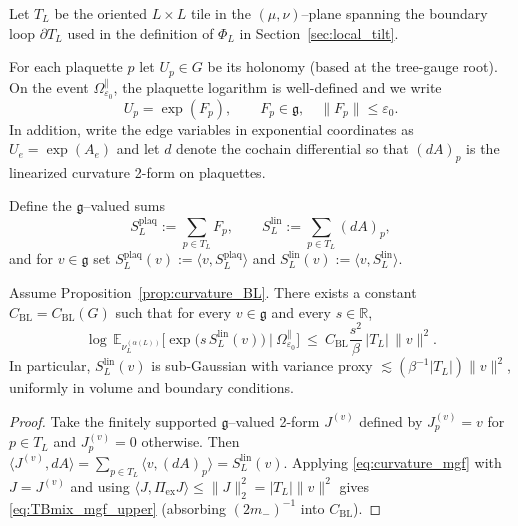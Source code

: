 \begin{definition}\label{def:surface_curvature_sum}
Let $T_L$ be the oriented $L\times L$ tile in the $(\mu,\nu)$--plane spanning the boundary loop $\partial T_L$ used in the definition
of $\Phi_L$ in Section~\ref{sec:local_tilt}. 

For each plaquette $p$ let $U_p\in G$ be its holonomy (based at the tree-gauge root). On the event $\Omega_{\varepsilon_0}^{\parallel}$,
the plaquette logarithm is well-defined and we write
\[
U_p=\exp(F_p),\qquad F_p\in\mathfrak g,\quad \|F_p\|\le \varepsilon_0.
\]
In addition, write the edge variables in exponential coordinates as $U_e=\exp(A_e)$ and let $d$ denote the cochain differential so that
$(dA)_p$ is the linearized curvature 2-form on plaquettes.

Define the $\mathfrak g$--valued sums
\[
S_L^{\mathrm{plaq}}:=\sum_{p\in T_L}F_p,\qquad
S_L^{\mathrm{lin}}:=\sum_{p\in T_L}(dA)_p,
\]
and for $v\in\mathfrak g$ set $S_L^{\mathrm{plaq}}(v):=\langle v,S_L^{\mathrm{plaq}}\rangle$ and
$S_L^{\mathrm{lin}}(v):=\langle v,S_L^{\mathrm{lin}}\rangle$.
\end{definition}


\begin{lemma}\label{lem:TBmix_subgaussian}
Assume Proposition~\ref{prop:curvature_BL}. There exists a constant $C_{\mathrm{BL}}=C_{\mathrm{BL}}(G)$ such that for every $v\in\mathfrak g$
and every $s\in\mathbb R$,
\begin{equation}\label{eq:TBmix_mgf_upper}
\log\,\mathbb E_{\nu_L^{(\alpha(L))}}\Big[\exp\big(s\,S_L^{\mathrm{lin}}(v)\big)\ \big|\ \Omega_{\varepsilon_0}^{\parallel}\Big]
\ \le\ C_{\mathrm{BL}}\frac{s^2}{\beta}\,|T_L|\,\|v\|^2.
\end{equation}
In particular, $S_L^{\mathrm{lin}}(v)$ is sub-Gaussian with variance proxy $\lesssim (\beta^{-1}|T_L|)\|v\|^2$, uniformly in volume and boundary conditions.
\end{lemma}

\begin{proof}
Take the finitely supported $\mathfrak g$--valued 2-form $J^{(v)}$ defined by $J^{(v)}_p=v$ for $p\in T_L$ and $J^{(v)}_p=0$ otherwise.
Then $\langle J^{(v)},dA\rangle=\sum_{p\in T_L}\langle v,(dA)_p\rangle=S_L^{\mathrm{lin}}(v)$.
Applying \eqref{eq:curvature_mgf} with $J=J^{(v)}$ and using $\langle J,\Pi_{\mathrm{ex}}J\rangle\le\|J\|_2^2=|T_L|\|v\|^2$
gives \eqref{eq:TBmix_mgf_upper} (absorbing $(2m_-)^{-1}$ into $C_{\mathrm{BL}}$).
\end{proof}




